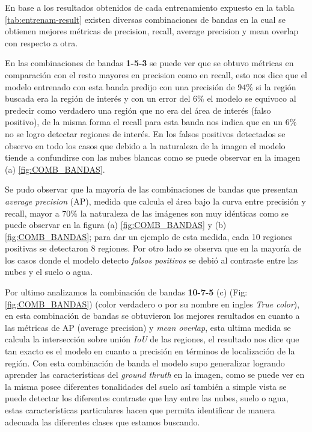 En base a los resultados obtenidos de cada entrenamiento expuesto en la tabla \ref{tab:entrenam-result} existen diversas combinaciones de bandas en la cual se obtienen mejores métricas de precision, recall, average precision y mean overlap con respecto a otra.  

En las combinaciones de bandas \textbf{1-5-3} se puede ver que se obtuvo métricas en comparación con el resto mayores en precision como en recall, esto nos dice que el modelo entrenado con esta banda predijo con una precisión de  $94\%$  si la región buscada era la región de interés y con un error del $6\%$ el modelo se equivoco al predecir como verdadero una región que no era del área de interés (falso positivo), de la misma forma el recall para esta banda nos indica que en un $6\%$ no se logro detectar regiones de interés. En los falsos positivos detectados se observo en todo los casos que debido a la naturaleza de la imagen el modelo tiende a confundirse con las nubes blancas como se puede observar en la imagen (a) \ref{fig:COMB_BANDAS}.

Se pudo observar que la mayoría de las combinaciones de bandas que presentan \textit{average precision} (AP), medida que calcula  el área bajo la curva entre precisión y recall, mayor a $70\%$ la naturaleza de las imágenes son muy idénticas como se puede observar en la figura (a) \ref{fig:COMB_BANDAS} y (b) \ref{fig:COMB_BANDAS}; para dar un ejemplo de esta medida, cada 10 regiones positivas se detectaron $8$ regiones. Por otro lado se observa que en la mayoría de los casos donde el modelo detecto \textit{falsos positivos} se debió al contraste entre las nubes y el suelo o agua.



Por ultimo analizamos la combinación de bandas \textbf{10-7-5} (c) (Fig:\ref{fig:COMB_BANDAS}) (color verdadero o por su nombre en ingles \textit{True color}), en esta combinación de bandas se obtuvieron los mejores resultados en cuanto a las métricas de AP (average precision) y  \textit{mean overlap}, esta ultima medida se calcula la intersección sobre unión \textit{IoU} de las regiones, el resultado nos dice que tan exacto es el modelo en cuanto a precisión en términos de localización de la región. Con esta combinación de banda el modelo supo generalizar logrando aprender las características del \textit{ground thruth} en la imagen, como se puede ver en la misma posee diferentes tonalidades del suelo así también a simple vista se puede detectar los diferentes contraste que hay entre las nubes, suelo o agua, estas características particulares hacen que permita identificar de manera adecuada las diferentes clases que estamos buscando.

